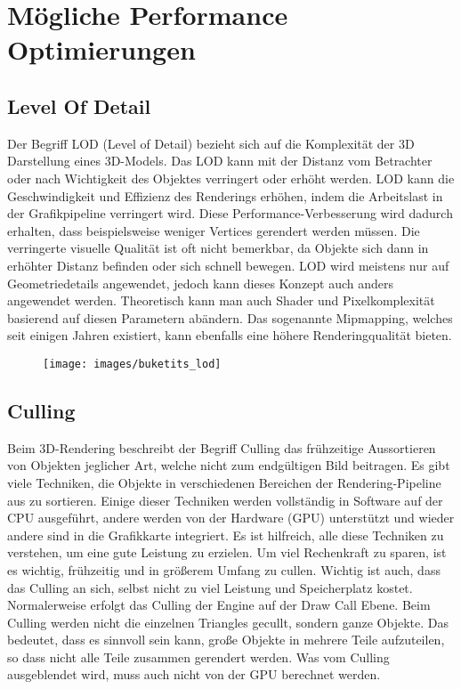 \chapter{Mögliche Performance Optimierungen}
\section{Level Of Detail}
Der Begriff LOD (Level of Detail) bezieht sich auf die Komplexität der 3D Darstellung eines 3D-Models. Das LOD kann mit der Distanz vom Betrachter oder nach Wichtigkeit des Objektes verringert oder erhöht werden. LOD kann die Geschwindigkeit und Effizienz des Renderings erhöhen, indem die Arbeitslast in der Grafikpipeline verringert wird. Diese Performance-Verbesserung wird dadurch erhalten, dass beispielsweise weniger Vertices gerendert werden müssen. Die verringerte visuelle Qualität ist oft nicht bemerkbar, da Objekte sich dann in erhöhter Distanz befinden oder sich schnell bewegen. LOD wird meistens nur auf Geometriedetails angewendet, jedoch kann dieses Konzept auch anders angewendet werden. Theoretisch kann man auch Shader und Pixelkomplexität basierend auf diesen Parametern abändern. Das sogenannte Mipmapping, welches seit einigen Jahren existiert, kann ebenfalls eine höhere Renderingqualität bieten.

\begin{figure}[h]
	\centering
	\texttt{[image: images/buketits\_lod]}
	\caption{\cite{_lod_formeshes}}
\end{figure}


\section{Culling}
Beim 3D-Rendering beschreibt der Begriff Culling das frühzeitige Aussortieren von Objekten jeglicher Art, welche nicht zum endgültigen Bild beitragen. Es gibt viele Techniken, die Objekte in verschiedenen Bereichen der Rendering-Pipeline aus zu sortieren. Einige dieser Techniken werden vollständig in Software auf der CPU ausgeführt, andere werden von der Hardware (GPU) unterstützt und wieder andere sind in die Grafikkarte integriert. Es ist hilfreich, alle diese Techniken zu verstehen, um eine gute Leistung zu erzielen. Um viel Rechenkraft zu sparen, ist es wichtig, frühzeitig und in größerem Umfang zu cullen. Wichtig ist auch, dass das Culling an sich, selbst nicht zu viel Leistung und Speicherplatz kostet.
Normalerweise erfolgt das Culling der Engine auf der Draw Call Ebene. Beim Culling werden nicht die einzelnen Triangles gecullt, sondern ganze Objekte. Das bedeutet, dass es sinnvoll sein kann, große Objekte in mehrere Teile aufzuteilen, so dass nicht alle Teile zusammen gerendert werden.
Was vom Culling ausgeblendet wird, muss auch nicht von der GPU berechnet werden.

